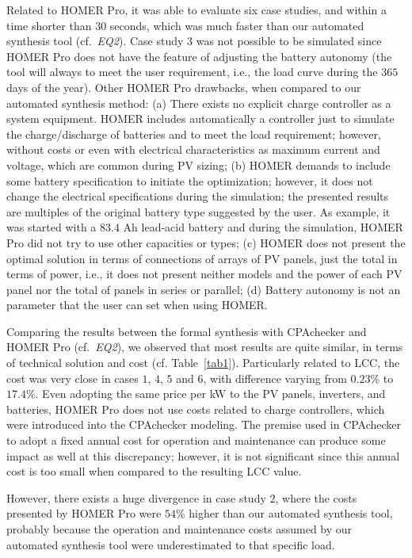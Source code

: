 \documentclass[journal]{IEEEtran}
\begin{document}
Related to HOMER Pro, it was able to evaluate six case studies, and within a time shorter than $30$ seconds, which was much faster than our automated synthesis tool  (cf.~\textit{EQ2}). Case study $3$ was not possible to be simulated since HOMER Pro does not have the feature of adjusting the battery autonomy (the tool will always to meet the user requirement, i.e., the load curve during the $365$ days of the year). Other HOMER Pro drawbacks, when compared to our automated synthesis method: (a) There exists no explicit charge controller as a system equipment. HOMER includes automatically a controller just to simulate the charge/discharge of batteries and to meet the load requirement; however, without costs or even with electrical characteristics as maximum current and voltage, which are common during PV sizing; (b) HOMER demands to include some battery specification to initiate the optimization; however, it does not change the electrical specifications during the simulation; the presented results are multiples of the original battery type suggested by the user. As example, it was started with a $83.4$ Ah lead-acid battery and during the simulation, HOMER Pro did not try to use other capacities or types; (c) HOMER does not present the optimal solution in terms of connections of arrays of PV panels, just the total in terms of power, i.e., it does not present neither models and the power of each PV panel nor the total of panels in series or parallel; (d) Battery autonomy is not an parameter that the user can set when using HOMER. 

Comparing the results between the formal synthesis with CPAchecker and HOMER Pro  (cf.~\textit{EQ2}), we observed that most results are quite similar, in terms of technical solution and cost (cf. Table~\ref{tab1}). Particularly related to LCC, the cost was very close in cases 
$1$, $4$, $5$ and $6$, with difference varying from $0.23$\% to $17.4$\%. 
Even adopting the same price per kW to the PV panels, 
inverters, and batteries, HOMER Pro does not use costs 
related to charge controllers, which were introduced into the 
CPAchecker modeling. The premise used in CPAchecker to adopt 
a fixed annual cost for operation and maintenance can produce 
some impact as well at this discrepancy; however, it is not significant
since this annual cost is too small when compared to the resulting LCC value.

However, there exists a huge divergence in case study $2$, where the costs presented by HOMER Pro were $54$\% higher than our automated synthesis tool, probably because the operation and maintenance costs assumed by our automated synthesis tool were underestimated to that specific load. 
\end{document}

